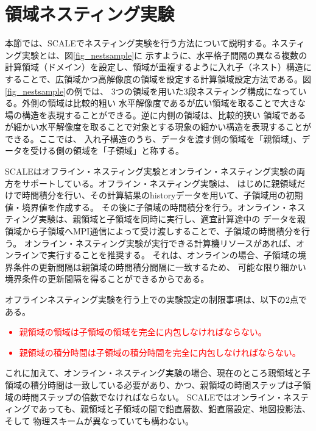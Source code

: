 \section{領域ネスティング実験} \label{sec:nest_exp}

本節では、SCALEでネスティング実験を行う方法について説明する。ネスティング実験とは、図\ref{fig_nestsample}に
示すように、水平格子間隔の異なる複数の計算領域（ドメイン）を設定し、領域が重複するように入れ子（ネスト）構造に
することで、広領域かつ高解像度の領域を設定する計算領域設定方法である。図\ref{fig_nestsample}の例では、
3つの領域を用いた3段ネスティング構成になっている。外側の領域は比較的粗い
水平解像度であるが広い領域を取ることで大きな場の構造を表現することができる。逆に内側の領域は、比較的狭い
領域であるが細かい水平解像度を取ることで対象とする現象の細かい構造を表現することができる。ここでは、
入れ子構造のうち、データを渡す側の領域を「親領域」、データを受ける側の領域を「子領域」と称する。

SCALEはオフライン・ネスティング実験とオンライン・ネスティング実験の両方をサポートしている。オフライン・ネスティング実験は、
はじめに親領域だけで時間積分を行い、その計算結果のhistoryデータを用いて、子領域用の初期値・境界値を作成する。
その後に子領域の時間積分を行う。オンライン・ネスティング実験は、親領域と子領域を同時に実行し、適宜計算途中の
データを親領域から子領域へMPI通信によって受け渡しすることで、子領域の時間積分を行う。
オンライン・ネスティング実験が実行できる計算機リソースがあれば、オンラインで実行することを推奨する。
それは、オンラインの場合、子領域の境界条件の更新間隔は親領域の時間積分間隔に一致するため、
可能な限り細かい境界条件の更新間隔を得ることができるからである。


オフラインネスティング実験を行う上での実験設定の制限事項は、以下の2点である。
\textcolor{red}{
\begin{itemize}
 \item 親領域の領域は子領域の領域を完全に内包しなければならない。
 \item 親領域の積分時間は子領域の積分時間を完全に内包しなければならない。
\end{itemize}
}

これに加えて、オンライン・ネスティング実験の場合、現在のところ親領域と子領域の積分時間は一致している必要があり、かつ、親領域の時間ステップは子領域の時間ステップの倍数でなければならない。
SCALEではオンライン・ネスティングであっても、親領域と子領域の間で鉛直層数、鉛直層設定、地図投影法、そして
物理スキームが異なっていても構わない。

